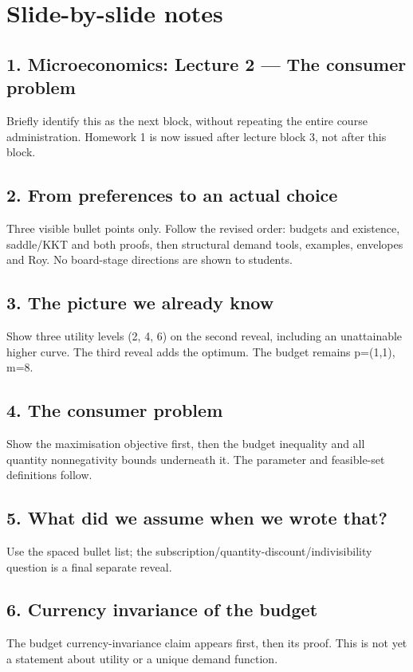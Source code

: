 \documentclass[11pt,a4paper]{article}
\begin{document}
\section*{Slide-by-slide notes}
\subsection*{1. Microeconomics: Lecture 2 — The consumer problem}
Briefly identify this as the next block, without repeating the entire course administration. Homework 1 is now issued after lecture block 3, not after this block.

\subsection*{2. From preferences to an actual choice}
Three visible bullet points only. Follow the revised order: budgets and existence, saddle/KKT and both proofs, then structural demand tools, examples, envelopes and Roy. No board-stage directions are shown to students.

\subsection*{3. The picture we already know}
Show three utility levels (2, 4, 6) on the second reveal, including an unattainable higher curve. The third reveal adds the optimum. The budget remains p=(1,1), m=8.

\subsection*{4. The consumer problem}
Show the maximisation objective first, then the budget inequality and all quantity nonnegativity bounds underneath it. The parameter and feasible-set definitions follow.

\subsection*{5. What did we assume when we wrote that?}
Use the spaced bullet list; the subscription/quantity-discount/indivisibility question is a final separate reveal.

\subsection*{6. Currency invariance of the budget}
The budget currency-invariance claim appears first, then its proof. This is not yet a statement about utility or a unique demand function.
\end{document}
